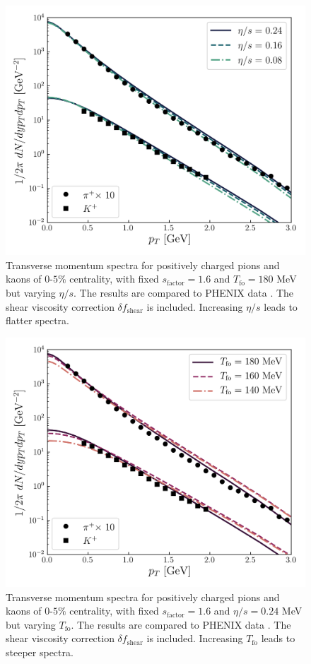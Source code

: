 \begin{figure}[!hbt]
	\includegraphics[width=\textwidth]{images/plot_etas_dep.png}
	\caption{\normalsize Transverse momentum spectra for positively charged pions and kaons of $0$-$5\%$ centrality, with fixed $s_\text{factor}=1.6$ and $T_\text{fo}=180$ MeV but varying $\eta/s$. The results are compared to {\sffamily PHENIX} data \cite{Adler:2003cb}. The shear viscosity correction $\delta f_\text{shear}$ is included. Increasing $\eta/s$ leads to flatter spectra.} 
\end{figure}

\begin{figure}[!hbt]
	\includegraphics[width=\textwidth]{images/plot_tfo_dep.png}
	\caption{\normalsize Transverse momentum spectra for positively charged pions and kaons of $0$-$5\%$ centrality, with fixed $s_\text{factor}=1.6$ and $\eta/s=0.24$ MeV but varying $T_\text{fo}$. The results are compared to {\sffamily PHENIX} data \cite{Adler:2003cb}. The shear viscosity correction $\delta f_\text{shear}$ is included. Increasing $T_\text{fo}$ leads to steeper spectra.} 
\end{figure}

